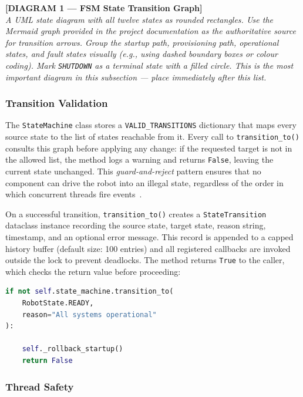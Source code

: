 \bigskip
\noindent\textbf{[DIAGRAM 1 — FSM State Transition Graph]}\\
\textit{A UML state diagram with all twelve states as rounded
rectangles. Use the Mermaid graph provided in the project
documentation as the authoritative source for transition arrows. Group
the startup path, provisioning path, operational states, and fault
states visually (e.g., using dashed boundary boxes or colour coding).
Mark \texttt{SHUTDOWN} as a terminal state with a filled circle. This
is the most important diagram in this subsection — place immediately
after this list.}
\bigskip
 
\subsubsection{Transition Validation}
 
The \texttt{StateMachine} class stores a
\texttt{VALID\_TRANSITIONS} dictionary that maps every source state to
the list of states reachable from it. Every call to
\texttt{transition\_to()} consults this graph before applying any
change: if the requested target is not in the allowed list, the method
logs a warning and returns \texttt{False}, leaving the current state
unchanged. This \emph{guard-and-reject} pattern ensures that no
component can drive the robot into an illegal state, regardless of
the order in which concurrent threads fire
events~\cite{hopcroft2006automata}.
 
On a successful transition, \texttt{transition\_to()} creates a
\texttt{StateTransition} dataclass instance recording the source
state, target state, reason string, timestamp, and an optional error
message. This record is appended to a capped history buffer
(default size: 100 entries) and all registered callbacks are invoked
outside the lock to prevent deadlocks. The method returns \texttt{True}
to the caller, which checks the return value before proceeding:
 
\begin{lstlisting}[language=Python,
                   caption={Guarded state transition in \texttt{app.py}.},
                   label={lst:transition}]
if not self.state_machine.transition_to(
    RobotState.READY,
    reason="All systems operational"
):
    
    self._rollback_startup()
    return False
\end{lstlisting}
 
\subsubsection{Thread Safety}
 
